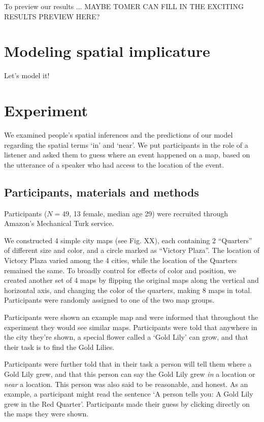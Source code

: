 \documentclass[10pt,letterpaper]{article}
\begin{document}
To preview our results ... MAYBE TOMER CAN FILL IN THE EXCITING RESULTS PREVIEW HERE?



\section{Modeling spatial implicature}\label{mod}

Let's model it!

\section{Experiment}\label{sec:exps}

We examined people's spatial inferences and the predictions of our model regarding the spatial terms `in' and `near'. We put participants in the role of a listener and asked them to guess where an event happened on a map, based on the utterance of a speaker who had access to the location of the event. 

\subsection{Participants, materials and methods}

Participants ($N=49$, 13 female, median age 29) were recruited through Amazon's Mechanical Turk service. 

We constructed 4 simple city maps (see Fig. XX), each containing 2 ``Quarters'' of different size and color, and a circle marked as ``Victory Plaza''. The location of Victory Plaza varied among the 4 cities, while the location of the Quarters remained the same. To broadly control for effects of color and position, we created another set of 4 maps by flipping the original maps along the vertical and horizontal axis, and changing the color of the quarters, making 8 maps in total. Participants were randomly assigned to one of the two map groups. 

Participants were shown an example map and were informed that throughout the experiment they would see similar maps. Participants were told that anywhere in the city they're shown, a special flower called a `Gold Lily' can grow, and that their task is to find the Gold Lilies. 

Participants were further told that in their task a person will tell them where a Gold Lily grew, and that this person can say the Gold Lily grew \textit{in} a location or \textit{near} a location. This person was also said to be reasonable, and honest. As an example, a participant might read the sentence `A person tells you: A Gold Lily grew in the Red Quarter'. Participants made their guess by clicking directly on the maps they were shown.
\end{document}
